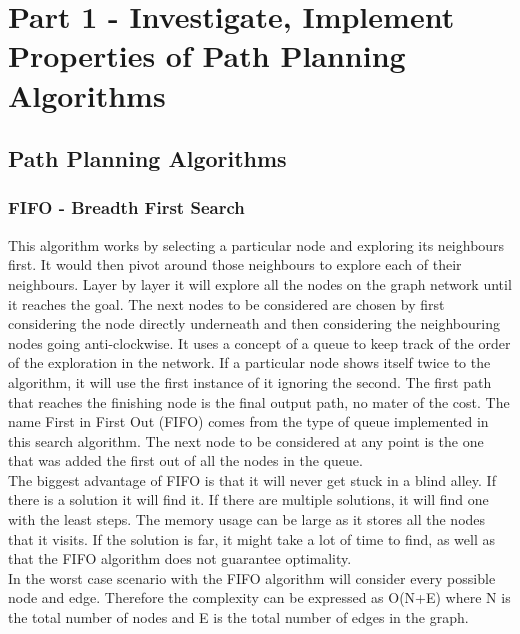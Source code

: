 \documentclass[a4paper,12pt]{article}
\begin{document}
	\pagebreak
	
	\tableofcontents
	
	\pagebreak
	
	\section{Part 1 - Investigate, Implement Properties of Path Planning Algorithms}
		
	\subsection{Path Planning Algorithms}

			\subsubsection{FIFO - Breadth First Search}

				This algorithm works by selecting a particular node and exploring its neighbours first. 
				It would then pivot around those neighbours to explore each of their neighbours. Layer by layer 
				it will explore all the nodes on the graph network until it reaches the goal. The next nodes to
				be considered are chosen by first considering the node directly underneath and then considering
				the neighbouring nodes going anti-clockwise. It uses a concept of a queue to keep track of the
				order of the exploration in the network. If a particular node shows itself twice to the algorithm,
				it will use the first instance of it ignoring the second. The first path that reaches the finishing
				node is the final output path, no mater of the cost. The name First in First Out (FIFO) comes from
				the type of queue implemented in this search algorithm. The next node to be considered at any point
				is the one that was added the first out of all the nodes in the queue. 
				\\
				The biggest advantage of FIFO is that it will never get stuck in a blind alley. If there is a 
				solution it will find it. If there are multiple solutions, it will find one with the least steps.
				The memory usage can be large as it stores all the nodes that it visits. If the solution is far,
				it might take a lot of time to find, as well as that the FIFO algorithm does not guarantee optimality.
				\\
				In the worst case scenario with the FIFO algorithm will consider every possible node and edge. Therefore
				the complexity can be expressed as O(N+E) where N is the total number of nodes and E is the total number
				of edges in the graph. 
			
\end{document}
